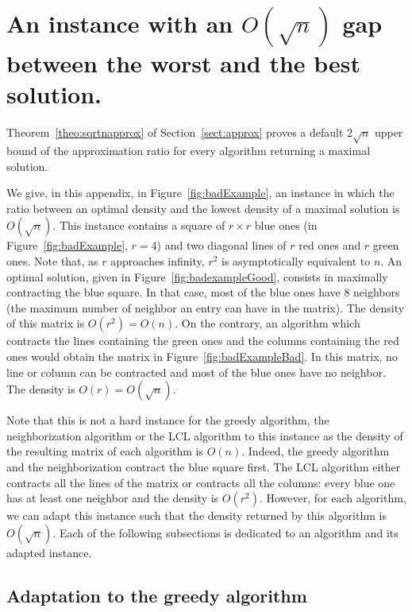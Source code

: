 \section{An instance with an $O(\sqrt{n})$ gap between the worst and the best solution.}

\label{apx:badinstance}


Theorem~\ref{theo:sqrtnapprox} of Section~\ref{sect:approx} proves a default $2\sqrt{n}$ upper bound of the approximation ratio for every algorithm returning a maximal solution.

We give, in this appendix, in Figure~\ref{fig:badExample}, an instance in which the ratio between an optimal density and the lowest density of a maximal solution is $O(\sqrt{n})$. This instance contains a square of $r \times r$ blue ones (in Figure~\ref{fig:badExample}, $r = 4$) and two diagonal lines of $r$ red ones and $r$ green ones. Note that, as $r$ approaches infinity, $r^2$ is asymptotically equivalent to $n$. An optimal solution, given in Figure~\ref{fig:badexampleGood}, consists in maximally contracting the blue square. In that case, most of the blue ones have 8 neighbors (the maximum number of neighbor an entry can have in the matrix). The density of this matrix is $O(r^2) = O(n)$. On the contrary, an algorithm which contracts the lines containing the green ones and the columns containing the red ones would obtain the matrix in Figure~\ref{fig:badExampleBad}. In this matrix, no line or column can be contracted and most of the blue ones have no neighbor. The density is $O(r) = O(\sqrt{n})$. 







Note that this is not a hard instance for the greedy algorithm, the neighborization algorithm or the LCL algorithm to this instance as the density of the resulting matrix of each algorithm is $O(n)$. Indeed, the greedy algorithm and the neighborization contract the blue square first. The LCL algorithm either contracts all the lines of the matrix or contracts all the columns: every blue one has at least one neighbor and the density is $O(r^2)$. However, for each algorithm, we can adapt this instance such that the density returned by this algorithm is $O(\sqrt{n})$. Each of the following subsections is dedicated to an algorithm and its adapted instance. 

\subsection{Adaptation to the greedy algorithm}

